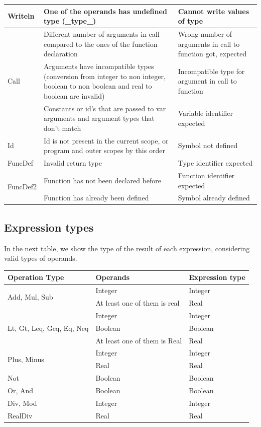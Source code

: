\documentclass[12pt]{article}
\begin{document}
\begin{longtable} {|p{3.0cm} | p{8cm} | p{4.0cm}|}
	Writeln 			& One of the operands has undefined type (\_type\_) & Cannot write values of type \\ \hline
	\multirow{3}{*}{Call} 	& Different number of arguments in call compared to the ones of the function declaration & Wrong number of arguments in call to function got, expected \\ \cline{2-3}
	 					& Arguments have incompatible types (conversion from integer to non integer, boolean to non boolean and real to boolean are invalid) & Incompatible type for argument in call to function  \\ \cline{2-3}
						& Constants or id's that are passed to var arguments and argument types that don't match & Variable identifier expected  \\ \hline
	Id 					& Id is not present in the current scope, or program and outer scopes by this order & Symbol not defined  \\ \hline
	FuncDef			& Invalid return type & Type identifier expected \\ \hline
	\multirow{2}{*}{FuncDef2} & Function has not been declared before & Function identifier expected \\ \cline{2-3}
					& Function has already been defined & Symbol already defined \\ \hline

\end{longtable}

\newpage

\subsection{Expression types}

In the next table, we show the type of the result of each expression, considering valid types of operands. \\

\begin{tabularx} {\textwidth} {|X|X|X|} 
\hline 
 \textbf{Operation Type} 	& \textbf{Operands} & \textbf{Expression type} \\ \hline
	\multirow{2}{*}{Add, Mul, Sub} 	& Integer & Integer \\ \cline{2-3}
									& At least one of them is real & Real \\ \hline
	\multirow{3}{*}{Lt, Gt, Leq, Geq, Eq, Neq} 	& Integer & Integer \\ \cline{2-3}
												& Boolean & Boolean \\ \cline{2-3}
												& At least one of them is Real & Real \\ \hline
	\multirow{2}{*}{Plus, Minus} 				& Integer & Integer \\ \cline{2-3}
												& Real & Real \\ \hline
	Not & Boolean & Boolean \\ \hline
	Or, And & Boolean & Boolean \\ \hline
	Div, Mod & Integer & Integer \\ \hline
	RealDiv & Real & Real \\ \hline
	

\end{tabularx}
\end{document}

